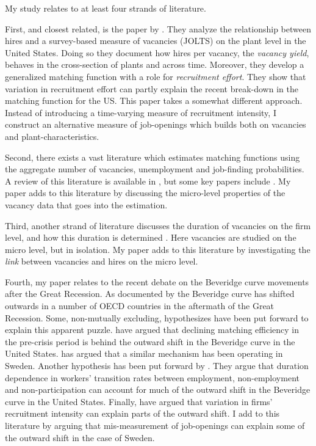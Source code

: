 My study relates to at least four strands of literature. 

First, and closest related, is the paper by \cite{Davis2013}. They analyze the relationship between hires and a survey-based measure of vacancies (JOLTS) on the plant level in the United States. Doing so they document how hires per vacancy, the \emph{vacancy yield}, behaves in the cross-section of plants and across time. Moreover, they develop a generalized matching function with a role for \emph{recruitment effort}. They show that variation in recruitment effort can partly explain the recent break-down in the matching function for the US. This paper takes a somewhat different approach. Instead of introducing a time-varying measure of recruitment intensity, I construct an alternative measure of job-openings which builds both on vacancies and plant-characteristics. %

Second, there exists a vast literature which estimates matching functions using the aggregate number of vacancies, unemployment and job-finding probabilities. A review of this literature is available in \cite{Pissarides2000}, but some key papers include \cite{Blanchard1990, Berman1997, Yashiv2000, Hansen2004, Sunde2007, Gross1997, Entorf1998, Feve1996}. My paper adds to this literature by discussing the micro-level properties of the vacancy data that goes into the estimation. 

Third, another strand of literature discusses the duration of vacancies on the firm level, and how this duration is determined \citep{Ours1991, Burdett1998, Barron1997, Holzer1990}. Here vacancies are studied on the micro level, but in isolation. My paper adds to this literature by investigating the \emph{link} between vacancies and hires on the micro level. 

Fourth, my paper relates to the recent debate on the Beveridge curve movements after the Great Recession. As documented by \cite{Hobijn2012} the Beveridge curve has shifted outwards in a number of OECD countries in the aftermath of the Great Recession. Some, non-mutually excluding, hypothesizes have been put forward to explain this apparent puzzle. \cite{Hall2015} have argued that declining matching efficiency in the pre-crisis period is behind the outward shift in the Beveridge curve in the United States. \cite{Riksbank2012} has argued that a similar mechanism has been operating in Sweden. Another hypothesis has been put forward by \cite{Kroft2016}. They argue that duration dependence in workers' transition rates between employment, non-employment and non-participation can account for much of the outward shift in the Beveridge curve in the United States. Finally, \cite{Davis2013} have argued that variation in firms’ recruitment intensity can explain parts of the outward shift. I add to this literature by arguing that mis-measurement of job-openings can explain some of the outward shift in the case of Sweden. 


